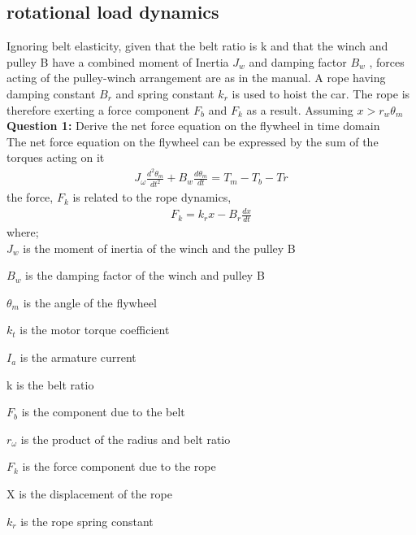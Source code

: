 \documentclass[10pt,a4paper]{report}
\begin{document}
\subsection{rotational load dynamics}
Ignoring belt elasticity, given that the belt ratio is k and that the winch and pulley B have a combined moment of Inertia $J_{w}$ and damping factor $B_{w}$ , forces acting of the pulley-winch arrangement are as in the manual. A rope having damping constant $B_{r}$ and spring constant $k_{r}$ is used to hoist the car. The rope is therefore exerting a force component $F_{b}$ and $F_{k}$ as a result. Assuming $x > r_{w} \theta_{m}$\\
\textbf{Question 1:}
Derive the net force equation on the flywheel in time domain\\
The net force equation on the flywheel can be expressed by the sum of the torques acting on it\\
\begin{eqnarray}
  J_{\omega}\frac{d^2\theta_{m}}{dt^2} + B_{w}\frac{d \theta_{m}}{dt} = T_{m} - T_{b} -T{r}
\end{eqnarray}
the force, $F_{k}$ is related to the rope dynamics,
\begin{eqnarray}
  F_{k} = k_{r}x - B_{r}\frac{dx}{dt}
\end{eqnarray}
where;\\
$J_{w}$ is the moment of inertia of the winch and the pulley B

$B_{w}$ is the damping factor of the winch and pulley B

$\theta_{m}$ is the angle of the flywheel

$k_{t}$ is the motor torque coefficient

$I_{a}$ is the armature current

k is the belt ratio

$F_{b}$ is the component due to the belt

$r_{\omega}$ is the product of the radius and belt ratio

$F_{k}$ is the force component due to the rope

X is the displacement of the rope

$k_{r}$ is the rope spring constant
\end{document}
